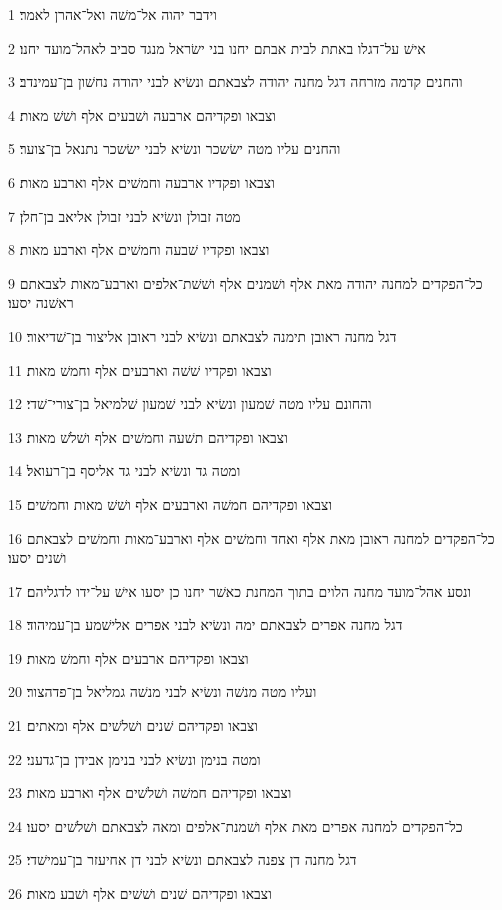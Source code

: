 \par 1 וידבר יהוה אל־משׁה ואל־אהרן לאמר׃
\par 2 אישׁ על־דגלו באתת לבית אבתם יחנו בני ישׂראל מנגד סביב לאהל־מועד יחנו׃
\par 3 והחנים קדמה מזרחה דגל מחנה יהודה לצבאתם ונשׂיא לבני יהודה נחשׁון בן־עמינדב׃
\par 4 וצבאו ופקדיהם ארבעה ושׁבעים אלף ושׁשׁ מאות׃
\par 5 והחנים עליו מטה ישׂשכר ונשׂיא לבני ישׂשכר נתנאל בן־צוער׃
\par 6 וצבאו ופקדיו ארבעה וחמשׁים אלף וארבע מאות׃
\par 7 מטה זבולן ונשׂיא לבני זבולן אליאב בן־חלן׃
\par 8 וצבאו ופקדיו שׁבעה וחמשׁים אלף וארבע מאות׃
\par 9 כל־הפקדים למחנה יהודה מאת אלף ושׁמנים אלף ושׁשׁת־אלפים וארבע־מאות לצבאתם ראשׁנה יסעו׃
\par 10 דגל מחנה ראובן תימנה לצבאתם ונשׂיא לבני ראובן אליצור בן־שׁדיאור׃
\par 11 וצבאו ופקדיו שׁשׁה וארבעים אלף וחמשׁ מאות׃
\par 12 והחונם עליו מטה שׁמעון ונשׂיא לבני שׁמעון שׁלמיאל בן־צורי־שׁדי׃
\par 13 וצבאו ופקדיהם תשׁעה וחמשׁים אלף ושׁלשׁ מאות׃
\par 14 ומטה גד ונשׂיא לבני גד אליסף בן־רעואל׃
\par 15 וצבאו ופקדיהם חמשׁה וארבעים אלף ושׁשׁ מאות וחמשׁים׃
\par 16 כל־הפקדים למחנה ראובן מאת אלף ואחד וחמשׁים אלף וארבע־מאות וחמשׁים לצבאתם ושׁנים יסעו׃
\par 17 ונסע אהל־מועד מחנה הלוים בתוך המחנת כאשׁר יחנו כן יסעו אישׁ על־ידו לדגליהם׃
\par 18 דגל מחנה אפרים לצבאתם ימה ונשׂיא לבני אפרים אלישׁמע בן־עמיהוד׃
\par 19 וצבאו ופקדיהם ארבעים אלף וחמשׁ מאות׃
\par 20 ועליו מטה מנשׁה ונשׂיא לבני מנשׁה גמליאל בן־פדהצור׃
\par 21 וצבאו ופקדיהם שׁנים ושׁלשׁים אלף ומאתים׃
\par 22 ומטה בנימן ונשׂיא לבני בנימן אבידן בן־גדעני׃
\par 23 וצבאו ופקדיהם חמשׁה ושׁלשׁים אלף וארבע מאות׃
\par 24 כל־הפקדים למחנה אפרים מאת אלף ושׁמנת־אלפים ומאה לצבאתם ושׁלשׁים יסעו׃
\par 25 דגל מחנה דן צפנה לצבאתם ונשׂיא לבני דן אחיעזר בן־עמישׁדי׃
\par 26 וצבאו ופקדיהם שׁנים ושׁשׁים אלף ושׁבע מאות׃
